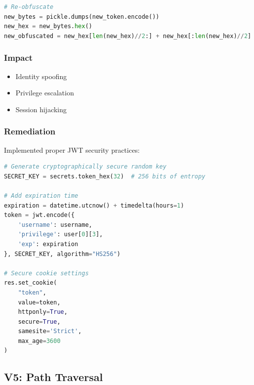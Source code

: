 \documentclass[11pt,a4paper]{article}
\newenvironment{vulnerability}[3]{%
    \begin{tcolorbox}[
        colback=white,
        colframe=#1,
        fonttitle=\bfseries\color{white},
        coltitle=#1,
        title=#2: #3
    ]
}{%
    \end{tcolorbox}
}
\begin{document}
\begin{vulnerability}{highcolor}{High}{JWT Implementation Flaws}
\begin{lstlisting}[language=Python]
# Re-obfuscate
new_bytes = pickle.dumps(new_token.encode())
new_hex = new_bytes.hex()
new_obfuscated = new_hex[len(new_hex)//2:] + new_hex[:len(new_hex)//2]
\end{lstlisting}
\subsubsection*{Impact}
\begin{itemize}
    \item Identity spoofing
    \item Privilege escalation
    \item Session hijacking
\end{itemize}



\end{vulnerability}

\begin{vulnerability}{highcolor}{High}{JWT Implementation Flaws}
\subsubsection*{Remediation}
Implemented proper JWT security practices:
    \begin{lstlisting}[language=Python]
# Generate cryptographically secure random key
SECRET_KEY = secrets.token_hex(32)  # 256 bits of entropy

# Add expiration time
expiration = datetime.utcnow() + timedelta(hours=1)
token = jwt.encode({
    'username': username,
    'privilege': user[0][3],
    'exp': expiration
}, SECRET_KEY, algorithm="HS256")

# Secure cookie settings
res.set_cookie(
    "token", 
    value=token, 
    httponly=True,
    secure=True,
    samesite='Strict',
    max_age=3600
)
\end{lstlisting}
\end{vulnerability}
\subsection{V5: Path Traversal}
\end{document}
